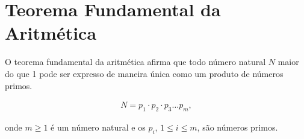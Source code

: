 \section{Teorema Fundamental da Aritmética}

O teorema fundamental da aritmética afirma que todo número natural $N$ maior do que 1 pode ser expresso de maneira única como um produto de números primos.

\begin{align*}
    N = p_1 \cdot p_2 \cdot p_3 \dots p_m,
\end{align*}

onde $m \ge 1$ é um número natural e os $p_i$, $1 \le i \le m$, são números primos.

